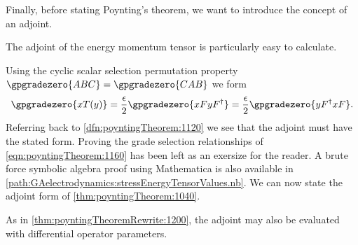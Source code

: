 Finally, before stating Poynting's theorem, we want to introduce the concept of an adjoint.

The adjoint of the energy momentum tensor is particularly easy to calculate.

Using
the cyclic scalar selection permutation property \(\gpgradezero{ABC} = \gpgradezero{CAB}\) we form
\begin{dmath}\label{eqn:poyntingTheorem:1160}
\gpgradezero{ x T(y) }
=
\frac{\epsilon}{2} \gpgradezero{ x F y F^\dagger }
=
\frac{\epsilon}{2} \gpgradezero{ y F^\dagger x F }.
\end{dmath}
Referring back to \cref{dfn:poyntingTheorem:1120} we see that the adjoint must have the stated form.
Proving the grade selection relationships of \cref{eqn:poyntingTheorem:1160} has been left as
an exersize for the reader.  A brute force symbolic algebra proof using Mathematica is also available in \cref{path:GAelectrodynamics:stressEnergyTensorValues.nb}.  We can now state the adjoint form of
\cref{thm:poyntingTheorem:1040}.

As in \cref{thm:poyntingTheoremRewrite:1200},
the adjoint may also be evaluated with differential operator parameters.

